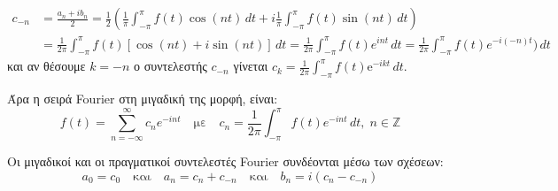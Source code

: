 \begin{align*}
  c_{-n} &= \frac{a_{n}+ib_{n}}{2} = \frac{1}{2} 
  \left(\frac{1}{\pi} \int _{- \pi }^{\pi } f(t) \cos{(nt)} \,{dt} + i
  \frac{1}{\pi} \int _{- \pi }^{\pi } f(t) \sin{(nt)} \,{dt}  \right) \\ 
         &= \frac{1}{2 \pi} \int _{- \pi }^{\pi} f(t) [\cos{(nt)} + i \sin{(nt)}] 
         \,{dt} = \frac{1}{2 \pi} \int _{- \pi }^{\pi } f(t) e^{int} \,{dt} = 
         \frac{1}{2 \pi} \int _{- \pi }^{\pi } f(t) e^{-i(-n)t}) \,{dt} 
\end{align*}
και αν θέσουμε $ k=-n $ ο συντελεστής $ c_{-n} $ γίνεται $ c_{k} =
\frac{1}{2 \pi} \int _{- \pi }^{\pi} f(t) \mathrm{e}^{-ikt}\,{dt} $.

Άρα η σειρά Fourier στη μιγαδική της μορφή, είναι:
\[
  \boxed{f(t) = \sum_{n=- \infty}^{\infty} c_{n} e^{-int} \quad \text{με} \quad c_{n} =
  \frac{1}{2 \pi} \int _{- \pi}^{\pi } f(t) e^{-int} \,{dt}, \; n \in \mathbb{Z}}
\]

\begin{rem}
  Οι μιγαδικοί και οι πραγματικοί συντελεστές Fourier συνδέονται μέσω των σχέσεων:
  \begin{equation}\label{eq:complex_coef}
    a_{0}= c_{0} \quad \text{και} \quad a_{n}= c_{n}+c_{-n} \quad \text{και} \quad 
    b_{n} = i(c_{n}-c_{-n})
  \end{equation} 
\end{rem}




